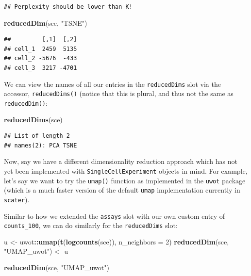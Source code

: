 \documentclass[]{book}
\newenvironment{Shaded}{\begin{snugshade}}{\end{snugshade}}
\newcommand{\DataTypeTok}[1]{\textcolor[rgb]{0.13,0.29,0.53}{#1}}
\newcommand{\DecValTok}[1]{\textcolor[rgb]{0.00,0.00,0.81}{#1}}
\newcommand{\KeywordTok}[1]{\textcolor[rgb]{0.13,0.29,0.53}{\textbf{#1}}}
\newcommand{\NormalTok}[1]{#1}
\newcommand{\OperatorTok}[1]{\textcolor[rgb]{0.81,0.36,0.00}{\textbf{#1}}}
\newcommand{\StringTok}[1]{\textcolor[rgb]{0.31,0.60,0.02}{#1}}
\begin{document}
\begin{verbatim}
## Perplexity should be lower than K!
\end{verbatim}

\begin{Shaded}
\begin{Highlighting}[]
\KeywordTok{reducedDim}\NormalTok{(sce, }\StringTok{"TSNE"}\NormalTok{)}
\end{Highlighting}
\end{Shaded}

\begin{verbatim}
##         [,1]  [,2]
## cell_1  2459  5135
## cell_2 -5676  -433
## cell_3  3217 -4701
\end{verbatim}

We can view the names of all our entries in the \texttt{reducedDims} slot via the accessor, \texttt{reducedDims()} (notice that this is plural, and thus not the same as \texttt{reducedDim()}:

\begin{Shaded}
\begin{Highlighting}[]
\KeywordTok{reducedDims}\NormalTok{(sce)}
\end{Highlighting}
\end{Shaded}

\begin{verbatim}
## List of length 2
## names(2): PCA TSNE
\end{verbatim}

Now, say we have a different dimensionality reduction approach which has not yet been implemented with \texttt{SingleCellExperiment} objects in mind. For example, let's say we want to try the \texttt{umap()} function as implemented in the \texttt{uwot} package (which is a much faster version of the default \texttt{umap} implementation currently in \texttt{scater}).

Similar to how we extended the \texttt{assays} slot with our own custom entry of \texttt{counts\_100}, we can do similarly for the \texttt{reducedDims} slot:

\begin{Shaded}
\begin{Highlighting}[]
\NormalTok{u <-}\StringTok{ }\NormalTok{uwot}\OperatorTok{::}\KeywordTok{umap}\NormalTok{(}\KeywordTok{t}\NormalTok{(}\KeywordTok{logcounts}\NormalTok{(sce)), }\DataTypeTok{n_neighbors =} \DecValTok{2}\NormalTok{)}
\KeywordTok{reducedDim}\NormalTok{(sce, }\StringTok{"UMAP_uwot"}\NormalTok{) <-}\StringTok{ }\NormalTok{u}

\KeywordTok{reducedDim}\NormalTok{(sce, }\StringTok{"UMAP_uwot"}\NormalTok{)}
\end{Highlighting}
\end{Shaded}
\end{document}
